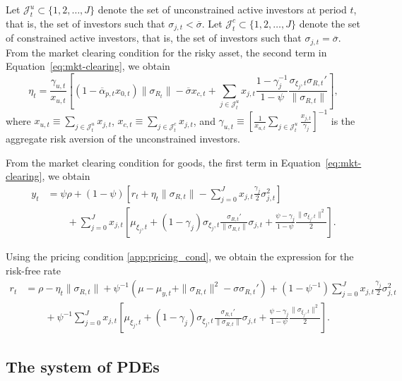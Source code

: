 Let $\mathcal{J}_t^u \subset \{1,2,\ldots, J\}$ denote the set of unconstrained active investors at period $t$, that is, the set of investors such that $\sigma_{j,t} < \overline{\sigma}$. Let $\mathcal{J}_t^c \subset \{1,2,\ldots, J\}$ denote the set of constrained active investors, that is, the set of investors such that $\sigma_{j,t} = \overline{\sigma}$. From the market clearing condition for the risky asset, the second term in Equation~\eqref{eq:mkt-clearing}, we obtain
\begin{equation}
    \eta_{t} =  \frac{\gamma_{u,t}}{x_{u,t}} \left[ (1-\overline{\alpha}_{p,t} x_{0,t})\|\sigma_{R_t}\| - \overline{\sigma} x_{c,t}+ \sum_{j\in \mathcal{J}_t^u} x_{j,t} \frac{1-\gamma_j^{-1}}{1-\psi} \frac{\sigma_{\xi_j,t} \sigma_{R,t}'}{\|\sigma_{R,t}\|}\right],
\end{equation}
where $x_{u,t} \equiv \sum_{j\in \mathcal{J}_t^u} x_{j,t}$, $x_{c,t} \equiv \sum_{j\in \mathcal{J}_t^c} x_{j,t}$, and $\gamma_{u,t} \equiv \left[\frac{1}{x_{u,t}} \sum_{j\in\mathcal{J}_t^u} \frac{x_{j,t}}{\gamma_j}\right]^{-1}$ is the aggregate risk aversion of the unconstrained investors.

From the market clearing condition for goods, the first term in Equation~\eqref{eq:mkt-clearing}, we obtain
\begin{align}
    y_t &= \psi \rho + (1-\psi) \left[ r_t + \eta_t \|\sigma_{R,t}\| - \sum_{j=0}^J x_{j,t}\frac{\gamma_j}{2} \sigma_{j,t}^2 \right] \nonumber\\
    &\qquad +\sum_{j=0}^J x_{j,t} \left[\mu_{\xi_j,t} + (1-\gamma_j)  \sigma_{\xi_j,t} \frac{\sigma_{R,t}'}{\|\sigma_{R,t}\|} \sigma_{j,t} + \frac{\psi - \gamma_j}{1-\psi} \frac{\|\sigma_{\xi_j,t} \|^2}{2}\right].
\end{align}

Using the pricing condition \eqref{app:pricing_cond}, we obtain the expression for the risk-free rate
\begin{align}
     r_t   &  =  \rho - \eta_t \|\sigma_{R,t}\| +\psi^{-1} (\mu - \mu_{y,t}+\|\sigma_{R,t}\|^2- \sigma \sigma_{R,t}')+ \left(1-\psi^{-1}\right)  \sum_{j=0}^J x_{j,t}\frac{\gamma_j}{2} \sigma_{j,t}^2 \nonumber\\
    &\qquad +\psi^{-1}\sum_{j=0}^J x_{j,t} \left[\mu_{\xi_j,t} + (1-\gamma_j)  \sigma_{\xi_j,t} \frac{\sigma_{R,t}'}{\|\sigma_{R,t}\|} \sigma_{j,t} + \frac{\psi - \gamma_j}{1-\psi} \frac{\|\sigma_{\xi_j,t} \|^2}{2}\right].
\end{align}

\subsection{The system of PDEs}

